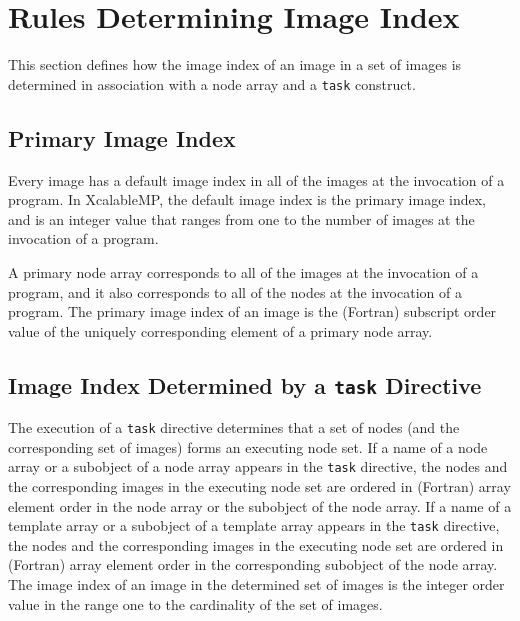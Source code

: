 \section{Rules Determining Image Index}
This section defines how the image index of an image in a set of images
is determined in association with a node array and a {\tt task} construct.



\subsection{Primary Image Index}
Every image has a default image index in all of the images at the
invocation of a program. 
In XcalableMP, the default image index is the primary image index,
and is an integer value that ranges from one to the number of images
at the invocation of a program. 

A primary node array corresponds to all of the images at the invocation of
a program, and it also corresponds to all of the nodes at the invocation of
a program.
The primary image index of an image is the (Fortran) subscript order value of 
the uniquely corresponding element of a primary node array.


\subsection{Image Index Determined by a {\tt task} Directive}

The execution of a {\tt task} directive determines that a set of nodes (and
the corresponding set of images) forms an executing node set.
If a name of a node array or a subobject of a node array 
appears in the {\tt task} directive, the nodes and the corresponding 
images in the executing node set are ordered in (Fortran) array element order in
the node array or the subobject of the node array.
If a name of a template array or a subobject of a template array
appears in the {\tt task} directive, the nodes and the corresponding images 
in the executing node set 
are ordered in (Fortran) array element order in the corresponding 
subobject of the node array.
The image index of an image in the determined set of images 
is the integer order value in the range one to the cardinality of the set of images.


